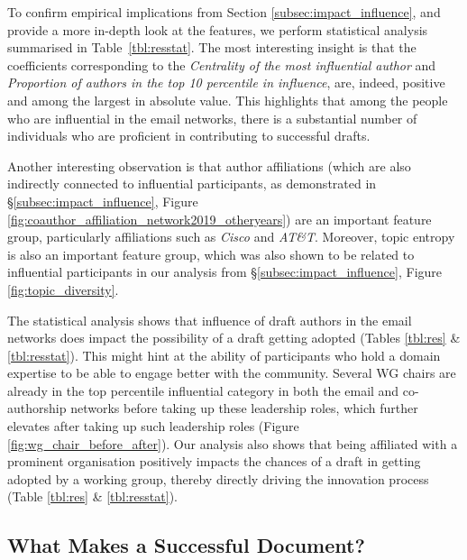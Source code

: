 \documentclass[twocolumn,10pt]{article}
\newcommand{\pb}[1]{\vspace{0.75ex}\noindent{\textbf{#1}}}
\begin{document}
\pb{Predicting Adoption:}
To confirm empirical implications from Section \ref{subsec:impact_influence},
and provide a more in-depth look at the features, we perform statistical
analysis summarised in Table~\ref{tbl:resstat}. The most interesting
insight is that the coefficients corresponding to the \emph{Centrality of
the most influential author} and \emph{Proportion of authors in the top 10
percentile in influence}, are, indeed, positive and among the largest in
absolute value. This highlights that among the people who are influential
in the email networks, there is a substantial number of individuals who are
proficient in contributing to successful drafts.

Another interesting observation is that author affiliations (which are
also indirectly connected to influential participants, as demonstrated in 
\S\ref{subsec:impact_influence}, Figure \ref{fig:coauthor_affiliation_network2019_otheryears})
are an important feature group, particularly affiliations such as \textit{Cisco}
and \textit{AT\&T}. Moreover, topic entropy is also an important feature
group, which was also shown to be related to influential participants in
our analysis from \S\ref{subsec:impact_influence}, Figure \ref{fig:topic_diversity}. 

\pb{Summary:}
The statistical analysis shows that influence of draft authors in the email
networks does impact the possibility of a draft getting adopted (Tables
\ref{tbl:res} \& \ref{tbl:resstat}). This might hint at the ability of
participants who hold a domain expertise to be able to engage better with
the community. Several WG chairs are already in the top percentile
influential category in both the email and co-authorship networks before
taking up these leadership roles, which further elevates after taking up
such leadership roles (Figure \ref{fig:wg_chair_before_after}).  Our
analysis also shows that being affiliated with a prominent organisation
positively impacts the chances of a draft in getting adopted by a working
group, thereby directly driving the innovation process (Table \ref{tbl:res}
\& \ref{tbl:resstat}).

\subsection{What Makes a Successful Document?}
\label{sec:success-factors:documents}
\end{document}
